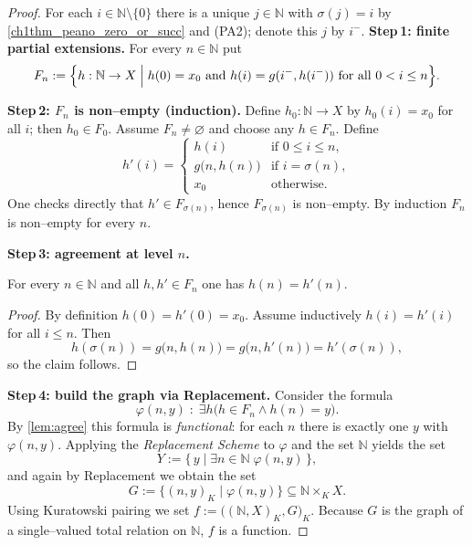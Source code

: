 \begin{proof}
	For each $i\in\mathbb{N}\setminus\{0\}$ there is a unique
	$j\in\mathbb{N}$ with $\sigma(j)=i$ by
	\cref{ch1thm_peano_zero_or_succ} and (PA2);  
	denote this $j$ by $i^{-}$.
	\textbf{Step 1: finite partial extensions.}
	For every $n\in\mathbb{N}$ put
	\[
	F_{n}:=
	\Bigl\{
	h:\mathbb{N}\to X\;\Big|\;
	h(0)=x_{0}\text{ and }
	h(i)=g(i^{-},h(i^{-})) \text{ for all }0<i\le n
	\Bigr\}.
	\]
	
	\textbf{Step 2: $F_{n}$ is non–empty (induction).}
	Define $h_{0}:\mathbb N\to X$ by $h_{0}(i)=x_{0}$ for all $i$; then
	$h_{0}\in F_{0}$.  
	Assume $F_{n}\neq\varnothing$ and choose any $h\in F_{n}$.  
	Define
	\[
	h'(i)=
	\begin{cases}
		h(i) &\text{if }0\le i\le n,\\[2pt]
		g\!\bigl(n,h(n)\bigr) &\text{if }i=\sigma(n),\\[2pt]
		x_{0} &\text{otherwise.}
	\end{cases}
	\]
	One checks directly that $h'\in F_{\sigma(n)}$, hence $F_{\sigma(n)}$
	is non–empty.  By induction $F_{n}$ is non–empty for every $n$.
	
	\textbf{Step 3: agreement at level $n$.}
	\begin{lemma}\label{lem:agree}
		For every $n\in\mathbb{N}$ and all $h,h'\in F_{n}$ one has
		$h(n)=h'(n)$.
	\end{lemma}
	
	\begin{proof}
		By definition $h(0)=h'(0)=x_{0}$.  
		Assume inductively $h(i)=h'(i)$ for all $i\le n$.
		Then
		\[
		h(\sigma(n))=g\bigl(n,h(n)\bigr)=
		g\bigl(n,h'(n)\bigr)=h'(\sigma(n)),
		\]
		so the claim follows.
	\end{proof}
	
	\textbf{Step 4: build the graph via Replacement.}
	Consider the formula
	\[
	\varphi(n,y)\;:\;\exists h\bigl(h\in F_{n}\land h(n)=y\bigr).
	\]
	By \cref{lem:agree} this formula is \emph{functional}:  
	for each $n$ there is exactly one $y$ with $\varphi(n,y)$.
	Applying the \emph{Replacement Scheme} to $\varphi$ and the set
	$\mathbb N$ yields the set 
	\[
	Y:=\{\,y\mid \exists n\in\mathbb N\; \varphi(n,y)\,\},
	\]
	and again by Replacement we obtain the set
	\[
	G:=\bigl\{(n,y)_{K}\mid \varphi(n,y)\bigr\}
	\subseteq\mathbb N\times_{K}X .
	\]
	Using Kuratowski pairing we set 
	\(f:=\bigl((\mathbb N,X)_{K},G\bigr)_{K}\).
	Because $G$ is the graph of a single–valued total relation on
	$\mathbb N$, $f$ is a function.
	

\end{proof}
